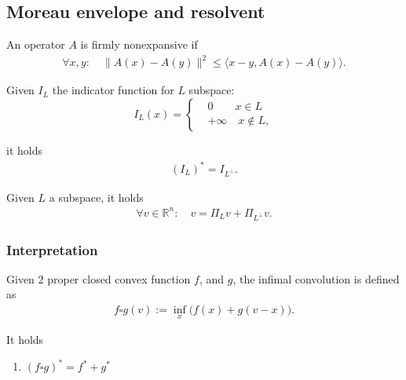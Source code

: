 \subsection{Moreau envelope and resolvent}

\begin{definition}
	An operator $A$ is firmly nonexpansive if 
	\begin{align*}
		\forall x, y: \quad \|A(x) - A(y)\|^2 \le \langle x - y, A(x) - A(y) \rangle. 
	\end{align*}
\end{definition}



\begin{lemma}
	Given $I_L$ the indicator function for $L$ subspace:
	\begin{equation*}
	I_L(x)=\left\{
	\begin{aligned}
		& 0 \qquad x \in L\\
		& + \infty \quad x \notin L, 
	\end{aligned}	
	\right.	
	\end{equation*}

	it holds
	\begin{align*}
		(I_L)^* = I_{L^\perp}. 
	\end{align*}
\end{lemma}

\begin{corollary}
	Given $L$ a subspace, it holds
	\begin{align*}
		\forall v \in \mathbb{R}^n: \quad v = \Pi_{L} v + \Pi_{L^\perp}v . 
	\end{align*}
\end{corollary}


\subsubsection{Interpretation}
\begin{definition}
	Given 2 proper closed convex function $f$, and $g$, the infimal convolution is defined as 
	\begin{align*}
		f \square g(v):= \inf_x \bigg( f(x) +  g(v - x) \bigg). 
	\end{align*}
\end{definition}

\begin{lemma}
	It holds
	\begin{enumerate}
		\item $(f \square g)^* = f^* + g^*$
	\end{enumerate}
\end{lemma}

